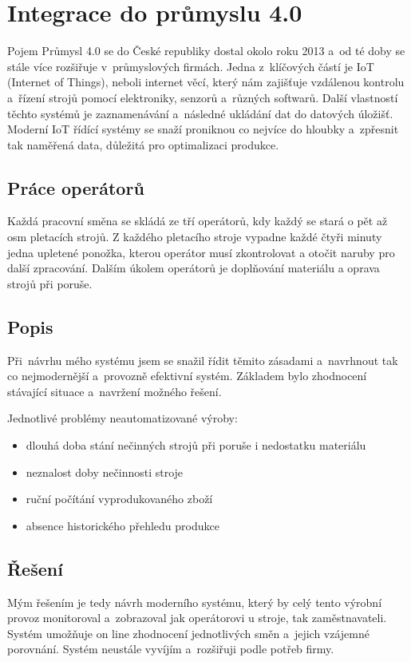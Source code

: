\chapter{Integrace do průmyslu 4.0}
Pojem Průmysl 4.0 se do České republiky dostal okolo roku 2013 a~od té doby se stále více rozšiřuje v~průmyslových firmách.
Jedna z~klíčových částí je IoT (Internet of Things), neboli internet věcí, který nám zajišťuje vzdálenou kontrolu a~řízení strojů pomocí elektroniky, senzorů a~různých softwarů.
Další vlastností těchto systémů je zaznamenávání a~následné ukládání dat do datových úložišť.
Moderní IoT řídící systémy se snaží proniknou co nejvíce do hloubky a~zpřesnit tak naměřená data, důležitá pro optimalizaci produkce.   

\section{Práce operátorů}
Každá pracovní směna se skládá ze tří operátorů, kdy každý se stará o pět až osm pletacích strojů.
Z každého pletacího stroje vypadne každé čtyři minuty jedna upletené ponožka, kterou operátor musí zkontrolovat a otočit naruby pro další zpracování.
Dalším úkolem operátorů je doplňování materiálu a oprava strojů při poruše.

\section{Popis}
Při~návrhu mého systému jsem se snažil řídit těmito zásadami a~navrhnout tak co nejmodernější a~provozně efektivní systém.
Základem bylo zhodnocení stávající situace a~navržení možného řešení.

Jednotlivé problémy neautomatizované výroby:
\begin{itemize}
    \item dlouhá doba stání nečinných strojů při poruše i nedostatku materiálu
    \item neznalost doby nečinnosti stroje
    \item ruční počítání vyprodukovaného zboží
    \item absence historického přehledu produkce
\end{itemize}

\section{Řešení}
Mým řešením je tedy návrh moderního systému, který by celý tento výrobní provoz monitoroval a~zobrazoval jak operátorovi u stroje, tak zaměstnavateli.
Systém umožňuje on line zhodnocení jednotlivých směn a~jejich vzájemné porovnání.
Systém neustále vyvíjím a~rozšiřuji podle potřeb firmy.

